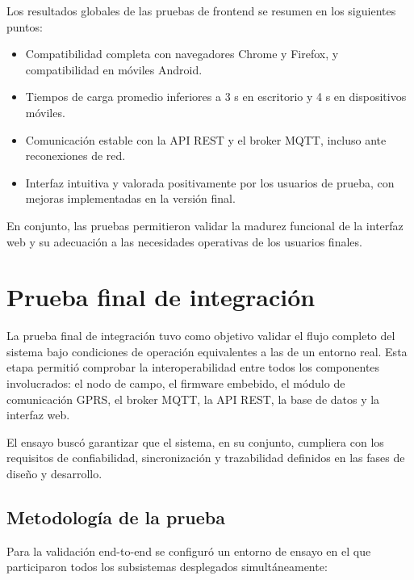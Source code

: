 Los resultados globales de las pruebas de frontend se resumen en los siguientes puntos:
\begin{itemize}
    \item Compatibilidad completa con navegadores Chrome y Firefox, y compatibilidad  en móviles Android.
    \item Tiempos de carga promedio inferiores a 3 s en escritorio y 4 s en dispositivos móviles.
    \item Comunicación estable con la API REST y el broker MQTT, incluso ante reconexiones de red.
    \item Interfaz intuitiva y valorada positivamente por los usuarios de prueba, con mejoras implementadas en la versión final.
\end{itemize}

En conjunto, las pruebas permitieron validar la madurez funcional de la interfaz web y su adecuación a las necesidades operativas de los usuarios finales.  




\section{Prueba final de integración}
\label{sec:prueba-integracion}

La prueba final de integración tuvo como objetivo validar el flujo completo del sistema bajo condiciones de operación equivalentes a las de un entorno real.  
Esta etapa permitió comprobar la interoperabilidad entre todos los componentes involucrados: el nodo de campo, el firmware embebido, el módulo de comunicación GPRS, el broker MQTT, la API REST, la base de datos y la interfaz web.  

El ensayo buscó garantizar que el sistema, en su conjunto, cumpliera con los requisitos de confiabilidad, sincronización y trazabilidad definidos en las fases de diseño y desarrollo.  

\subsection{Metodología de la prueba}

Para la validación end-to-end se configuró un entorno de ensayo en el que participaron todos los subsistemas desplegados simultáneamente:

